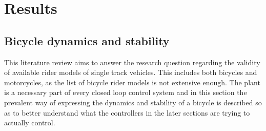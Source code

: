 \chapter{Results}
\label{results}

\section{Bicycle dynamics and stability} \label{sub:bicycle}
This literature review aims to answer the research question regarding the validity of available rider models of single track vehicles. This includes both bicycles and motorcycles, as the list of bicycle rider models is not extensive enough. The plant is a necessary part of every closed loop control system and in this section the prevalent  way of expressing the dynamics and stability of a bicycle is described so as to better understand  what the controllers in the later sections are trying to actually control.
